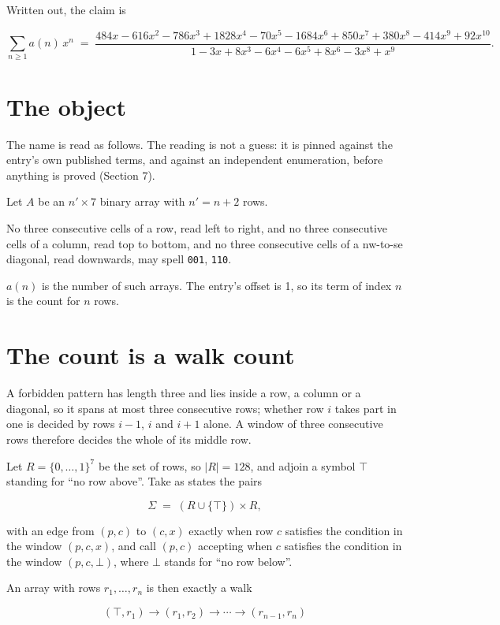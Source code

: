 \documentclass[11pt]{article}
\theoremstyle{definition}
\begin{document}
Written out, the claim is

\[\sum_{n \ge 1} a(n)\,x^n \;=\; \frac{484x - 616x^{2} - 786x^{3} + 1828x^{4} - 70x^{5} - 1684x^{6} + 850x^{7} + 380x^{8} - 414x^{9} + 92x^{10}}{1 - 3x + 8x^{3} - 6x^{4} - 6x^{5} + 8x^{6} - 3x^{8} + x^{9}}.\]

\section{The object}

The name is read as follows. The reading is not a guess: it is pinned against the entry's own published terms, and against an independent enumeration, before anything is proved (Section 7).

Let $A$ be an $n' \times 7$ binary array with $n' = n + 2$ rows.

No three consecutive cells of a row, read left to right, and no three consecutive cells of a column, read top to bottom, and no three consecutive cells of a nw-to-se diagonal, read downwards, may spell \texttt{001}, \texttt{110}.

$a(n)$ is the number of such arrays. The entry's offset is 1, so its term of index $n$ is the count for $n$ rows.

\section{The count is a walk count}

A forbidden pattern has length three and lies inside a row, a column or a diagonal, so it spans at most three consecutive rows; whether row $i$ takes part in one is decided by rows $i-1$, $i$ and $i+1$ alone. A window of three consecutive rows therefore decides the whole of its middle row.

Let $R = \{0,\dots,1\}^{7}$ be the set of rows, so $|R| = 128$, and adjoin a symbol $\top$ standing for ``no row above''. Take as states the pairs

\[\Sigma \;=\; (R \cup \{\top\}) \times R,\]

with an edge from $(p,c)$ to $(c,x)$ exactly when row $c$ satisfies the condition in the window $(p,c,x)$, and call $(p,c)$ accepting when $c$ satisfies the condition in the window $(p,c,\bot)$, where $\bot$ stands for ``no row below''.

An array with rows $r_1,\dots,r_n$ is then exactly a walk

\[(\top,r_1) \to (r_1,r_2) \to \cdots \to (r_{n-1},r_n)\]
\end{document}
